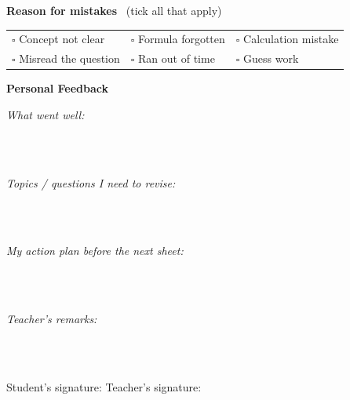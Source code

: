 \documentclass[11pt,a4paper]{article}
\begin{document}
\bigskip
\textbf{Reason for mistakes} \ {\small(tick all that apply)}\par\smallskip
\begin{tabularx}{\linewidth}{@{}XXX@{}}$\square$ Concept not clear & $\square$ Formula forgotten & $\square$ Calculation mistake\\[3pt] $\square$ Misread the question & $\square$ Ran out of time & $\square$ Guess work\end{tabularx}
\bigskip
\textbf{Personal Feedback}\par\smallskip
\textit{What went well:}\par\vspace{2pt}
\noindent\rule{0pt}{1.35em}\hrulefill\\ \rule{0pt}{1.35em}\hrulefill\\[4pt]
\textit{Topics / questions I need to revise:}\par\vspace{2pt}
\noindent\rule{0pt}{1.35em}\hrulefill\\ \rule{0pt}{1.35em}\hrulefill\\[4pt]
\textit{My action plan before the next sheet:}\par\vspace{2pt}
\noindent\rule{0pt}{1.35em}\hrulefill\\ \rule{0pt}{1.35em}\hrulefill\\[8pt]
\textit{Teacher's remarks:}\par\vspace{2pt}
\noindent\rule{0pt}{1.35em}\hrulefill\\ \rule{0pt}{1.35em}\hrulefill\\[14pt]
Student's signature: \underline{\hspace{4cm}}\hfill Teacher's signature: \underline{\hspace{4cm}}
\end{document}
